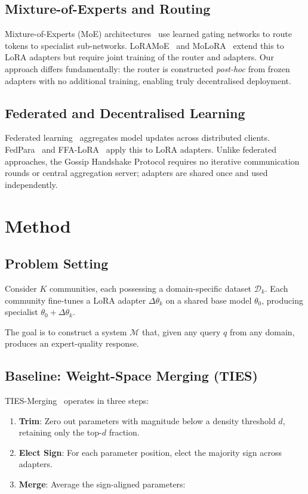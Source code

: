 \documentclass[conference, 10pt]{IEEEtran}
\begin{document}
\subsection{Mixture-of-Experts and Routing}
Mixture-of-Experts (MoE) architectures~\cite{shazeer2017outrageously}
use learned gating networks to route tokens to specialist sub-networks.
LoRAMoE~\cite{dou2024loramoe} and MoLoRA~\cite{zadouri2023pushing}
extend this to LoRA adapters but require joint training of the router
and adapters. Our approach differs fundamentally: the router is
constructed \emph{post-hoc} from frozen adapters with no additional
training, enabling truly decentralised deployment.

\subsection{Federated and Decentralised Learning}
Federated learning~\cite{mcmahan2017communication} aggregates model
updates across distributed clients. FedPara~\cite{hyeon2022fedpara} and
FFA-LoRA~\cite{sun2024improving} apply this to LoRA adapters.
Unlike federated approaches, the Gossip Handshake Protocol requires no
iterative communication rounds or central aggregation server; adapters
are shared once and used independently.

\section{Method}
\label{sec:method}

\subsection{Problem Setting}

Consider $K$ communities, each possessing a domain-specific dataset
$\mathcal{D}_k$. Each community fine-tunes a LoRA adapter
$\Delta\theta_k$ on a shared base model $\theta_0$, producing
specialist $\theta_0 + \Delta\theta_k$.

The goal is to construct a system $\mathcal{M}$ that, given any query
$q$ from any domain, produces an expert-quality response.

\subsection{Baseline: Weight-Space Merging (TIES)}
\label{sec:ties}

TIES-Merging~\cite{yadav2023ties} operates in three steps:
\begin{enumerate}
    \item \textbf{Trim}: Zero out parameters with magnitude below a
          density threshold $d$, retaining only the top-$d$ fraction.
    \item \textbf{Elect Sign}: For each parameter position, elect the
          majority sign across adapters.
    \item \textbf{Merge}: Average the sign-aligned parameters:
\end{enumerate}
\end{document}
